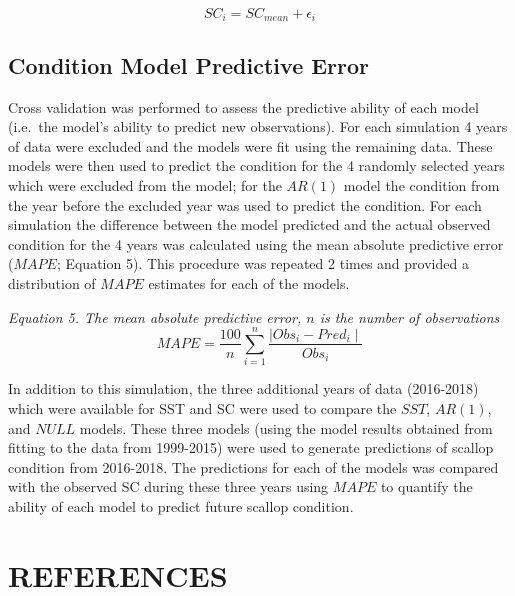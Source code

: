 \documentclass[
]{article}
\begin{document}
\begin{equation} SC_{i} =  SC_{mean} + \epsilon_i    \end{equation}

\hypertarget{condition-model-predictive-error}{%
\subsection{Condition Model Predictive Error}\label{condition-model-predictive-error}}

Cross validation was performed to assess the predictive ability of each model (i.e.~the model's ability to predict new observations). For each simulation 4 years of data were excluded and the models were fit using the remaining data. These models were then used to predict the condition for the 4 randomly selected years which were excluded from the model; for the \(AR(1)\) model the condition from the year before the excluded year was used to predict the condition. For each simulation the difference between the model predicted and the actual observed condition for the 4 years was calculated using the mean absolute predictive error (\(MAPE\); Equation 5). This procedure was repeated 2 times and provided a distribution of \(MAPE\) estimates for each of the models.

\emph{Equation 5. The mean absolute predictive error, \(n\) is the number of observations}
\[MAPE = \frac{100}{n}\sum_{i=1}^{n} \frac{\mid Obs_i - Pred_i \mid }{Obs_i} \]

In addition to this simulation, the three additional years of data (2016-2018) which were available for SST and SC were used to compare the \(SST\), \(AR(1)\), and \(NULL\) models. These three models (using the model results obtained from fitting to the data from 1999-2015) were used to generate predictions of scallop condition from 2016-2018. The predictions for each of the models was compared with the observed SC during these three years using \(MAPE\) to quantify the ability of each model to predict future scallop condition.

\newpage

\hypertarget{references}{%
\section*{REFERENCES}\label{references}}
\end{document}
